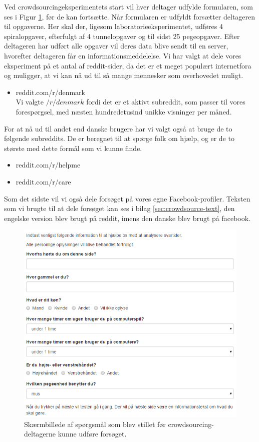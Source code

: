 Ved crowdsourcingeksperimentets start vil hver deltager udfylde formularen, som ses i Figur \ref{fig:Questions}, før de kan fortsætte. Når formularen er udfyldt forsætter deltageren til opgaverne. Her skal der, ligesom laboratorieeksperimentet, udføres 4 spiralopgaver, efterfulgt af 4 tunnelopgaver og til sidst 25 pegeopgaver. Efter deltageren har udført alle opgaver vil deres data blive sendt til en server, hvorefter deltageren får en informationsmeddelelse.
Vi har valgt at dele vores eksperiment på et antal af reddit-sider, da det er et meget populært internetfora og muliggør, at vi kan nå ud til så mange mennesker som overhovedet muligt.
\begin{itemize}
\item reddit.com/r/denmark\\
Vi valgte $/r/denmark$ fordi det er et aktivt subreddit, som passer til vores forespørgsel, med næsten hundredetusind unikke visninger per måned.
\end{itemize}
For at nå ud til andet end danske brugere har vi valgt også at bruge de to følgende subreddits. De er beregnet til at spørge folk om hjælp, og er de to største med dette formål som vi kunne finde.
\begin{itemize}
\item reddit.com/r/helpme
\item reddit.com/r/care
\end{itemize}

Som det sidste vil vi også dele forsøget på vores egne Facebook-profiler. Teksten som vi brugte til at dele forsøget kan ses i bilag \ref{sec:crowdsource-text}, den engelske version blev brugt på reddit, imens den danske blev brugt på facebook.
\begin{figure}[h]
\centering
\includegraphics[width=.5\linewidth, trim = 0cm 0cm 7cm 0cm, clip]{images/screenshots/ex_questions}
\caption{Skærmbillede af spørgsmål som blev stillet før crowdsourcing-deltagerne kunne udføre forsøget.}
\label{fig:Questions}
\end{figure}

